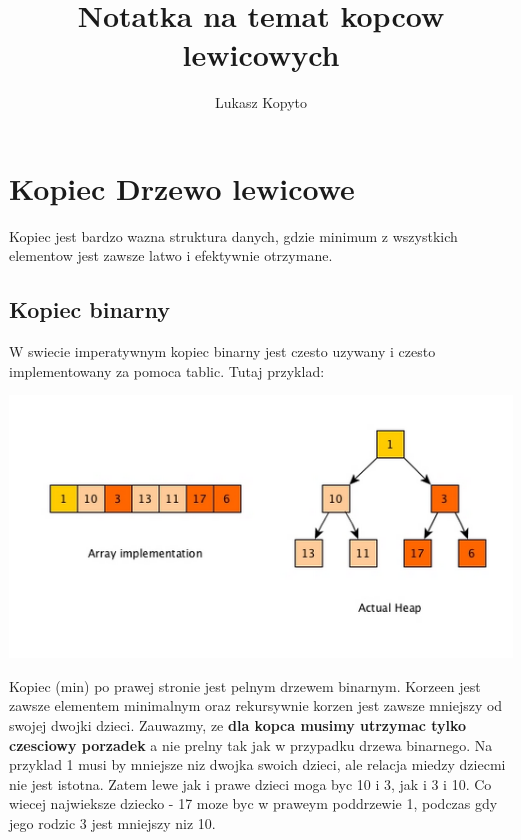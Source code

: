 \documentclass{article}
\author{Lukasz Kopyto}
\title{Notatka na temat kopcow lewicowych}
\begin{document}
\maketitle

\section{Kopiec Drzewo lewicowe}

Kopiec jest bardzo wazna struktura danych, gdzie minimum z wszystkich elementow jest zawsze latwo i efektywnie otrzymane.

\subsection{Kopiec binarny}

W swiecie imperatywnym kopiec binarny jest czesto uzywany i czesto implementowany za pomoca tablic. Tutaj przyklad:

\begin{center}
    \begin{minipage}[h]{0.8\textwidth}
        \centering
        \includegraphics[width=1.0\textwidth]{ex_bin_heap.png}
    \end{minipage}    
\end{center}

Kopiec (min) po prawej stronie jest pelnym drzewem binarnym. Korzeen jest zawsze elementem minimalnym oraz rekursywnie korzen jest zawsze mniejszy od swojej dwojki dzieci. Zauwazmy, ze \textbf{dla kopca musimy utrzymac tylko czesciowy porzadek} a nie prelny tak jak w przypadku drzewa binarnego. Na przyklad 1 musi by mniejsze niz dwojka swoich dzieci, ale relacja miedzy dziecmi nie jest istotna. Zatem lewe jak i prawe dzieci moga byc 10 i 3, jak i 3 i 10. Co wiecej najwieksze dziecko - 17 moze byc w praweym poddrzewie 1, podczas gdy jego rodzic 3 jest mniejszy niz 10.
\end{document}
